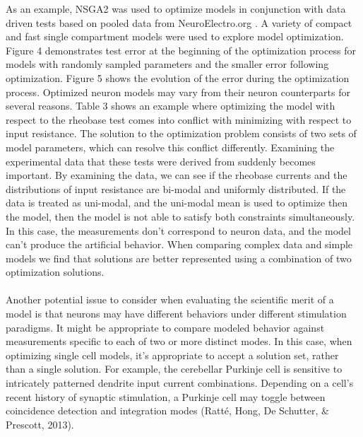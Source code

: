 As an example, NSGA2 was used to optimize models in conjunction with data driven tests based on pooled data from NeuroElectro.org \cite{tripathy2014neuroelectro}. A variety of compact and fast single compartment models were used to explore model optimization. Figure 4 demonstrates test error at the beginning of the optimization process for models with randomly sampled parameters and the smaller error following optimization. Figure 5 shows the evolution of the error during the optimization process. \newline
\newline
Optimized neuron models may vary from their neuron counterparts for several reasons. Table 3 shows an example where optimizing the model with respect to the rheobase test comes into conflict with minimizing with respect to input resistance. The solution to the optimization problem consists of two sets of model parameters, which can resolve this conflict differently. Examining the experimental data that these tests were derived from suddenly becomes important. By examining the data, we can see if the rheobase currents and the distributions of input resistance are bi-modal and uniformly distributed. If the data is treated as uni-modal, and the uni-modal mean is used to optimize then the model, then the model is not able to satisfy both constraints simultaneously. In this case, the measurements don’t correspond to neuron data, and the model can’t produce the artificial behavior. When comparing complex data and simple models we find that solutions are better represented using a combination of two optimization solutions.\\
\\
Another potential issue to consider when evaluating the scientific merit of a model is that neurons may have different behaviors under different stimulation paradigms. It might be appropriate to compare modeled behavior against measurements specific to each of two or more distinct modes. In this case, when optimizing single cell models, it’s appropriate to accept a solution set, rather than a single solution. For example, the cerebellar Purkinje cell is sensitive to intricately patterned dendrite input current combinations. Depending on a cell’s recent history of synaptic stimulation, a Purkinje cell may toggle between coincidence detection and integration modes (Ratté, Hong, De Schutter, \& Prescott, 2013).
\\


